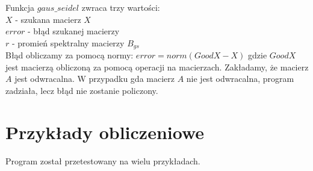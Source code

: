 \documentclass[12pt]{article}
\begin{document}
\noindent Funkcja $gaus\_seidel$ zwraca trzy wartości:\\

$X$ - szukana macierz $X$\\

$error$ - błąd szukanej macierzy\\

$r$ - promień spektralny macierzy $B_{gs}$\\

\noindent Błąd obliczamy za pomocą normy: $error=norm(GoodX-X)$ gdzie
$GoodX$ jest macierzą obliczoną za pomocą operacji na macierzach. Zakładamy, że macierz $A$ jest odwracalna. W przypadku gda macierz $A$ nie jest odwracalna, program zadziała, lecz błąd nie zostanie policzony.


\section{Przykłady obliczeniowe}
\noindent Program został przetestowany na wielu przykładach.
\end{document}
